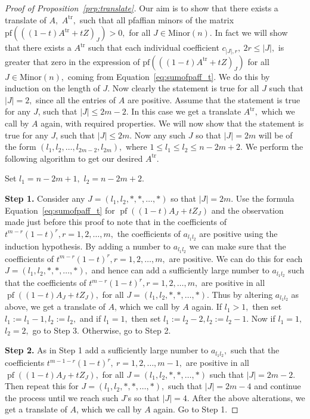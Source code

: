 \documentclass[9pt, BCOR=2mm]{amsart}
\numberwithin{equation}{section}
\numberwithin{equation}{section}
\begin{document}
\begin{proof}[Proof of Proposition~\ref{prp:translate}]
	
Our aim is to show that there exists a translate of $A,$ $A^{\mathrm{tr}},$ such that all pfaffian minors of the matrix  $\mathrm{pf}(((1-t)A^{\mathrm{tr}}+tZ)_J)>0,$ for all $J\in  \mathrm{Minor}(n).$ In fact we will show that there exists a $A^{\mathrm{tr}}$ such that each individual coefficient $c_{|J|,r},~ 2r\le |J|,$ is greater that zero in the expression of $\mathrm{pf}(((1-t)A^{\mathrm{tr}}+tZ)_J)$ for all $J\in  \mathrm{Minor}(n),$ coming from Equation~\ref{eq:sumofpaff_t}.
We do this by induction on the length of $J$. Now clearly the statement is true for all $J$ such that $|J|=2,$ since all the entries of $A$ are positive. Assume that the statement is true for any $J$, such that $|J|\le 2m-2$. In this case we get a translate $A^{\mathrm{tr}},$ which we call by $A$ again, with required properties. We will now show that the statement is true for any $J$, such that $|J|\le 2m.$ Now any such $J$ so that $|J|=2m$ will be of the form $(l_1,l_2,\dots,l_{2m-2},l_{2m}),$ where $1\le l_1 \le l_2\le n-2m+2.$ We perform the following algorithm to get our desired $A^{\mathrm{tr}}.$ 


 Set $l_1=n-2m+1,$ $l_2= n-2m+2.$ 

\noindent \textbf{Step 1.} Consider any $J= (l_1,l_2,*,*,\dots,*)$ so that $|J|=2m.$ Use the formula Equation~\ref{eq:sumofpaff_t} for $\operatorname{pf}((1-t)A_J+tZ_J)$ and the observation made just before this proof to note that in the coefficients of $t^{m-r}(1-t)^r, r=1,2,\dots,m,$ the coefficients of $a_{l_1l_2}$ are positive using the induction hypothesis. By adding a number to $a_{l_1l_2}$ we can make sure that the coefficients of $t^{m-r}(1-t)^r, r=1,2,\dots,m,$ are positive. We can do this for each  $J= (l_1,l_2,*,*,\dots,*),$ and hence can add a sufficiently large number to $a_{l_1l_2}$ such that the coefficients of $t^{m-r}(1-t)^r, r=1,2,\dots,m,$ are positive in all $\operatorname{pf}((1-t)A_J+tZ_J),$ for all $J= (l_1,l_2,*,*,\dots,*).$ Thus by altering $a_{l_1l_2}$ as above, we get a translate of $A$, which we call by $A$ again. If $l_1>1,$ then set $l_1:= l_1-1, l_2:=l_2,$ and if $l_1=1,$ then set $l_1:= l_2-2, l_2:=l_2-1.$ 
Now if $l_1=1,$ $l_2= 2,$ go to Step 3. Otherwise, go to Step 2.

\noindent \textbf{Step 2.}  As in Step 1 add a sufficiently large number to $a_{l_1l_2},$ such that the coefficients
$t^{m-1-r}(1-t)^r,~ r=1,2,\dots,m-1,$ are positive in all $\operatorname{pf}((1-t)A_J+tZ_J),$ for all $J= (l_1,l_2,*,*,\dots,*)$ such that 
 $|J|=2m-2.$ Then repeat this  for $J= (l_1,l_2,*,*,\dots,*),$ such that $|J|= 2m-4$ and continue the process until we reach such $J$'s so that $|J|=4.$ After the above alterations, we get a translate of $A$, which we call by $A$ again. Go to Step 1.



\end{proof}
\end{document}
